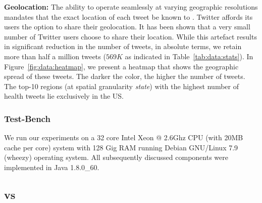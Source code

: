 {\bf Geolocation:} The ability to operate seamlessly at varying 
geographic resolutions mandates that the exact location of each 
tweet be known to \tmatam. Twitter affords its users the option 
to share their geolocation. It has been shown that a very small 
number of Twitter users choose to share their location. While 
this artefact results in significant reduction in the number of 
tweets, in absolute terms, we retain more than half a million 
tweets ($569K$ as indicated in Table~\ref{tab:data:stats}). 
In Figure~\ref{fig:data:heatmap}, we present a heatmap that shows 
the geographic spread of these tweets. The darker the color, 
the higher the number of tweets. The top-10 regions (at spatial 
granularity \emph{state}) with the highest number of health tweets 
lie exclusively in the US.

\subsubsection{Test-Bench}
We run our experiments on a {32 core Intel Xeon @ 2.6Ghz CPU 
(with 20MB cache per core)} system with {128 Gig} RAM running 
{Debian GNU/Linux 7.9 (wheezy)} operating system.
All subsequently discussed components were implemented in 
Java {1.8.0\_60}.

\subsection{\tmatam vs \tmlda}
\label{subsec:perf1}

